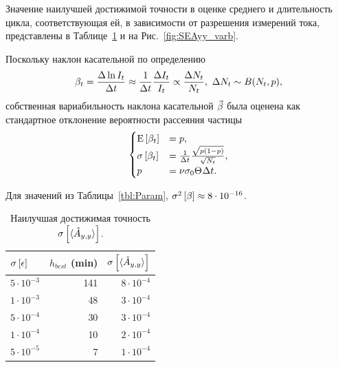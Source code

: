 \documentclass{article}
\begin{document}
	Значение наилучшей достижимой точности в оценке среднего и длительность цикла, соответствующая ей, в зависимости от разрешения измерений тока, представлены в Таблице~\ref{tbl:SEAyy_varb} и на Рис.~\ref{fig:SEAyy_varb}. 
		
	Поскольку наклон касательной по определению
	\[
	\slp[t] = \frac{\Delta \ln I_t}{\Delta t} \approx \frac{1}{\Delta t}\frac{\Delta I_t}{I_t} \propto \frac{\Delta N_t}{N_t}, ~\Delta N_t \sim B(N_t, p),
	\]
	собственная вариабильность наклона касательной $\vec{\slp}$ была оценена как стандартное отклонение вероятности рассеяния частицы 
	\begin{equation*}
	\begin{cases}
	\Xpct{\slp[t]} 	&= p, \\
	\SE{\slp[t]}		&= \frac{1}{\Delta t}\frac{\sqrt{p(1-p)}}{\sqrt{N_t}}, \\
	p 				&= \nu\CS[0]\Thick\Delta t.
	\end{cases}
	\end{equation*}
	
	Для значений из Таблицы~\ref{tbl:Param}, $\v{\slp} \approx 8\cdot 10^{-16}$.
	
	\begin{table}[h]
		\centering
		\caption{Наилучшая достижимая точность $\SE{\avg{\Ayy*}}$.\label{tbl:SEAyy_varb}}
		\begin{tabular}{lrr}
			\hline\hline
			$\SE{\err}$			&	$h_{best}$ (min)	& $\SE{\avg{\Ayy*}}$\\
			\hline
			$5\cdot10^{-3}$		&	141					& $8\cdot10^{-4}$\\
			$1\cdot10^{-3}$		&	48					& $3\cdot10^{-4}$\\
			$5\cdot10^{-4}$		&	30					& $3\cdot10^{-4}$\\
			$1\cdot10^{-4}$		&	10					& $2\cdot10^{-4}$\\
			$5\cdot10^{-5}$		&	7					& $1\cdot10^{-4}$\\
			\hline
		\end{tabular}
	\end{table}
\end{document}
